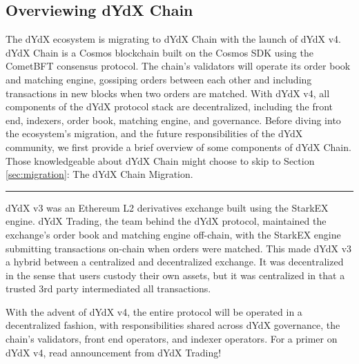 \begin{fullwidth}
    \section{Overviewing dYdX Chain} \label{sec:introduction}

    \begin{adjustwidth}{2cm}{2cm}
        \justify
        The dYdX ecosystem is migrating to dYdX Chain with the launch of dYdX v4. dYdX Chain is a Cosmos blockchain built on the Cosmos SDK using the CometBFT consensus protocol. The chain's validators will operate its order book and matching engine, gossiping orders between each other and including transactions in new blocks when two orders are matched. With dYdX v4, all components of the dYdX protocol stack are decentralized, including the front end, indexers, order book, matching engine, and governance. Before diving into the ecosystem's migration, and the future responsibilities of the dYdX community, we first provide a brief overview of some components of dYdX Chain. Those knowledgeable about dYdX Chain might choose to skip to Section \ref{sec:migration}: The dYdX Chain Migration.
    \end{adjustwidth}
    
    \textcolor{gray}{\rule{\linewidth}{0.1mm}}
    
\end{fullwidth}

    dYdX v3 was an Ethereum L2 derivatives exchange built using the StarkEX engine. dYdX Trading, the team behind the dYdX protocol, maintained the exchange's order book and matching engine off-chain, with the StarkEX engine submitting transactions on-chain when orders were matched. This made dYdX v3 a hybrid between a centralized and decentralized exchange. It was decentralized in the sense that users custody their own assets, but it was centralized in that a trusted 3rd party intermediated all transactions.
    
    With the advent of dYdX v4, the entire protocol will be operated in a decentralized fashion, with responsibilities shared across dYdX governance, the chain's validators, front end operators, and indexer operators. For a primer on dYdX v4, read  announcement from dYdX Trading!

